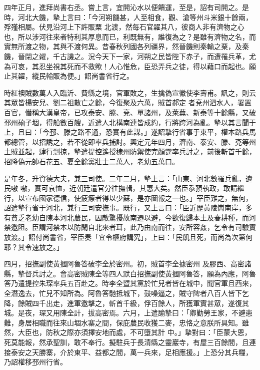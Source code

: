 \begin{pinyinscope}
 四年正月，進拜尚書右丞。嘗上言，宜開沁水以便饋運，至是，詔有司開之。是時，河北大饑，摯上言曰：「今河朔饑甚，人至相食，觀、滄等州斗米銀十餘兩，殍殣相屬。伏見沿河上下許販粟
 北渡，然每石官糴其八，彼商人非有濟物之心也，所以涉河往來者特利其厚息而已，利既無有，誰復為之？是雖有濟物之名，而實無所渡之物，其與不渡何異。昔春秋列國各列疆界，然晉饑則秦輸之粟，及秦饑，晉閉之糴，千古譏之。況今天下一家，河朔之民皆陛下赤子，而遭罹兵革，尤為可哀，其忍坐視其死而不救歟！人心惟危，臣恐弄兵之徒，得以藉口而起也。願止其糴，縱民輸販為便。」詔尚書省行之。



 時紅襖賊數萬人入臨沂、費縣之境，官軍敗之，生擒偽宣徽使李壽甫。訊之，則云其眾皆楊安兒、劉二祖散亡之餘，今復聚及六萬，賊首郝定
 者兗州泗水人，署置百官，僭稱大漢皇帝，已攻泰安、滕、兗、單諸州，及萊蕪、新泰等十餘縣，又破邳州硇子堌，得船數百艘，近遣人北構南連皆成約，行將跨河為亂。摯以其言聞于上，且曰：「今邳、滕之路不通，恐實有此謀。」遂詔摯行省事于東平，權本路兵馬都總管，以招誘之，若不從即率兵捕討。興定元年四月，濟南、泰安、滕、兗等州土賊並起，肆行剽掠，摯遣提控遙授棣州防禦使完顏霆率兵討之，前後斬首千餘，招降偽元帥石花五、夏全餘黨壯士二萬人，老幼五萬口。



 是年冬，升資德大夫，兼三司使。二年二月，摯上言：「山東、河北數罹兵亂，遺民嗷
 嗷，實可哀恤，近朝廷遣官分往撫輯，其惠大矣。然臣忝預執政，敢請繼行，以宣布國家德信，使疲瘵者得以少蘇，是亦圖報之一也。」宰臣難之，無何，詔遣摯行省于河北，兼行三司安撫事。既行，又上言曰：「臣近歷黃陵崗南岸，多有貧乏老幼自陳本河北農民，因敵驚擾故南遷以避，今欲復歸本土及春耕種，而河禁邀阻。臣謂河禁本以防閑自北來者耳，此乃由南而往，安所容姦，乞令有司驗實放渡。」詔付尚書省，宰臣奏「宜令樞府講究」，上曰：「民飢且死，而尚為次第何耶？其令速放之。」



 四月，招撫副使黃摑阿魯答破李全於密州。初，賊首李全據密州
 及膠西、高密諸縣，摯督兵討之。會高密賊陳全等四人默白招撫副使黃摑阿魯答，願為內應，阿魯答乃遣提控朱琛率兵五百赴之。時李全暨其黨於忙兒者皆在城中，聞官軍且西來，全潛逸去，忙兒不知所為。阿魯答馳抵城下，鼓噪逼之，賊守陴者八百人皆下乞降，餘賊四千出走，進軍邀擊之，斬首千級，俘百餘人，所獲軍實甚眾，遂復其城。是夜，琛又用陳全計，拔高密焉。六月，上遣諭摯曰：「卿勤勞王家，不避患難，身居相職而往來山堌水寨之間，保庇農民收獲二麥，忠恪之意朕所具知。雖然，大臣也，防秋之際亦須擇安地而處，不可墮其計
 中。」摯對曰：「臣蒙大恩，死莫能報，然承聖訓，敢不奉行。擬駐兵于長清縣之靈巖寺，有屋三百餘間，且連接泰安之天勝寨，介於東平、益都之間，萬一兵來，足相應援。」上恐分其兵糧，乃詔權移邳州行省。




\end{pinyinscope}
